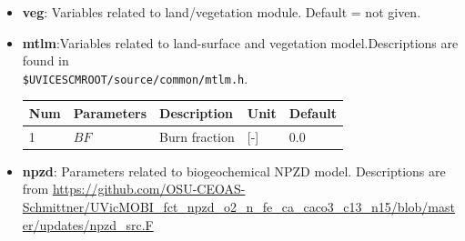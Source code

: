 \documentclass[a4paper]{article}
\begin{document}
\begin{itemize}
\item \textbf{veg}: Variables related to land/vegetation module. Default = not given.
\item \textbf{mtlm}:Variables related to land-surface and vegetation model.Descriptions are found in \\ \verb|$UVICESCMROOT/source/common/mtlm.h|.
{\footnotesize
\begin{longtable}{lllll} \hline
  Num  & Parameters                       & Description                                   & Unit                          & Default    \\ \hline 
  1    & $BF$                             & Burn fraction                                 & [-]                           & 0.0     \\    \hline
   \end{longtable}}
   
\item \textbf{npzd}: Parameters related to biogeochemical NPZD model. Descriptions are from \url{https://github.com/OSU-CEOAS-Schmittner/UVicMOBI_fct_npzd_o2_n_fe_ca_caco3_c13_n15/blob/master/updates/npzd_src.F}


\end{itemize}
\end{document}
